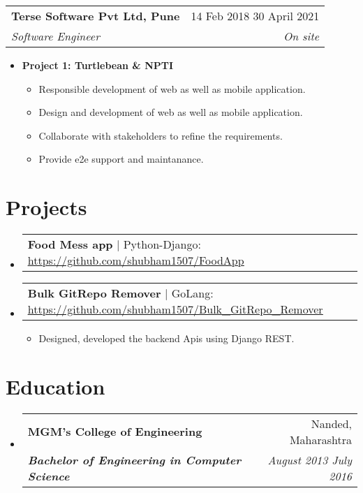 \documentclass[letterpaper, 11pt]{article}
\makeatletter
\newcommand{\resumeItem}[1]{
    \item \small {
        {#1 \vspace{-3pt}}
    }
}
\newcommand{\resumeSubheading}[4]{
  \vspace{-2pt}\item
    \begin{tabular*}{0.99\textwidth}[t]{l@{\extracolsep{\fill}}r}
      \textbf{#1} & #2 \\
      \textit{\small#3} & \textit{\small #4} \\
    \end{tabular*}\vspace{-7pt}
}
\newcommand{\resumeProjectHeading}[2]{
    \item
    \begin{tabular*}{0.99\textwidth}{l@{\extracolsep{\fill}}r}
      \small#1 & \textit{#2}\\
    \end{tabular*}\vspace{-7pt}
}
\newcommand{\resumeItemListStart}{\begin{itemize}[leftmargin=0.25in, label={\textbullet}]}
\newcommand{\resumeItemListEnd}{\end{itemize}\vspace{-10pt}}
\newcommand{\resumeSubHeadingListStart}{\begin{itemize}[leftmargin=0.15in, label={}]}
\newcommand{\resumeSubHeadingListEnd}{\end{itemize}}
\makeatother
\begin{document}
            \vspace{10pt} %

            \resumeSubheading{Terse Software Pvt Ltd, Pune}{14 Feb 2018 \textendash{} 30 April 2021}
                { Software Engineer}{On site}
                \resumeItemListStart{}
                    \item[] \textbf{Project 1: Turtlebean & NPTI}
                    \begin{itemize}[leftmargin=0.5in, label={\textbullet}]
                        \item Responsible development of web as well as mobile application.
                        \item Design and development of web as well as mobile application.
                        \item Collaborate with stakeholders to refine the requirements.
                        \item Provide e2e support and maintanance.
                    \end{itemize}
                \resumeItemListEnd{}
        
   
    
   
\vspace{-17pt}

\section{Projects}
\resumeSubHeadingListStart{}
    \resumeProjectHeading{\textbf{Food Mess app} $|$ Python-Django: \underline{\url{https://github.com/shubham1507/FoodApp}}}{}
    \resumeProjectHeading{\textbf{Bulk GitRepo Remover} $|$ GoLang: \underline{\url{https://github.com/shubham1507/Bulk_GitRepo_Remover}}}{}
    \vspace{10pt}
        \resumeItemListStart{}
            \resumeItem{Designed, developed the backend Apis using Django REST.}
        \resumeItemListEnd{}
\resumeSubHeadingListEnd{}

\vspace{-17pt}

\section{Education}
\resumeSubHeadingListStart{}
    \resumeSubheading{MGM's \textendash{} College of Engineering}{Nanded, Maharashtra}
        {\textbf{Bachelor of Engineering in Computer Science}}{August 2013 \textendash{} July 2016}
\resumeSubHeadingListEnd{}

\end{document}
